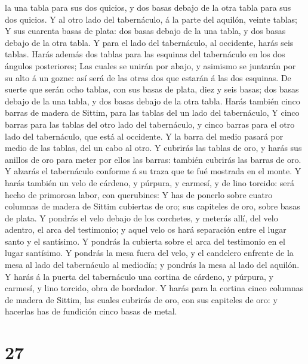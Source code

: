 la una tabla para sus dos quicios, y dos basas debajo de la otra tabla
para sus dos quicios.  Y al otro lado del tabernáculo, á la
parte del aquilón, veinte tablas;  Y sus cuarenta basas de
plata: dos basas debajo de la una tabla, y dos basas debajo de la otra
tabla.  Y para el lado del tabernáculo, al occidente, harás
seis tablas.  Harás además dos tablas para las esquinas del
tabernáculo en los dos ángulos posteriores;  Las cuales se
unirán por abajo, y asimismo se juntarán por su alto á un gozne: así
será de las otras dos que estarán á las dos esquinas.  De
suerte que serán ocho tablas, con sus basas de plata, diez y seis basas;
dos basas debajo de la una tabla, y dos basas debajo de la otra tabla.
 Harás también cinco barras de madera de Sittim, para las
tablas del un lado del tabernáculo,  Y cinco barras para
las tablas del otro lado del tabernáculo, y cinco barras para el otro
lado del tabernáculo, que está al occidente.  Y la barra
del medio pasará por medio de las tablas, del un cabo al otro.
 Y cubrirás las tablas de oro, y harás sus anillos de oro
para meter por ellos las barras: también cubrirás las barras de oro.
 Y alzarás el tabernáculo conforme á su traza que te fué
mostrada en el monte.  Y harás también un velo de cárdeno,
y púrpura, y carmesí, y de lino torcido: será hecho de primorosa labor,
con querubines:  Y has de ponerlo sobre cuatro columnas de
madera de Sittim cubiertas de oro; sus capiteles de oro, sobre basas de
plata.  Y pondrás el velo debajo de los corchetes, y
meterás allí, del velo adentro, el arca del testimonio; y aquel velo os
hará separación entre el lugar santo y el santísimo.  Y
pondrás la cubierta sobre el arca del testimonio en el lugar santísimo.
 Y pondrás la mesa fuera del velo, y el candelero enfrente
de la mesa al lado del tabernáculo al mediodía; y pondrás la mesa al
lado del aquilón.  Y harás á la puerta del tabernáculo una
cortina de cárdeno, y púrpura, y carmesí, y lino torcido, obra de
bordador.  Y harás para la cortina cinco columnas de madera
de Sittim, las cuales cubrirás de oro, con sus capiteles de oro: y
hacerlas has de fundición cinco basas de metal.

\hypertarget{section-26}{%
\section{27}\label{section-26}}

